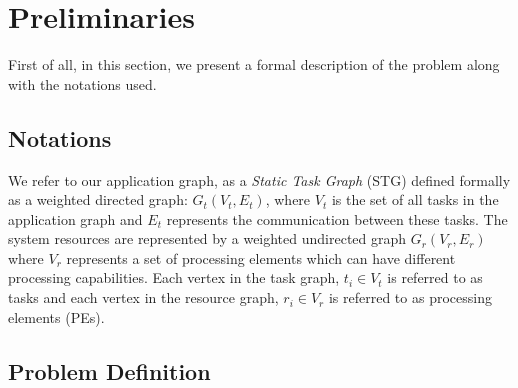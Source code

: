 \documentclass[10pt, conference, compsocconf]{IEEEtran}
\begin{document}
%
\IEEEpeerreviewmaketitle




\section{Preliminaries}
\label{sec:preliminaries}

First of all, in this section, we present a formal description of the
problem along with the notations used.

\subsection{Notations}

We refer to our application graph, as a \textit{Static Task Graph} (STG)
defined formally as a weighted directed graph: $G_t(V_t, E_t)$, where
$V_t$ is the set of all tasks in the application graph and $E_t$
represents the communication between these tasks. The system resources
are represented by a weighted undirected graph $G_r(V_r, E_r)$ where
$V_r$ represents a set of processing elements which can have different
processing capabilities. Each vertex in the task graph, $t_i \in V_t$ is
referred to as tasks and each vertex in the resource graph, $r_i \in
V_r$ is referred to as processing elements (PEs). %

\subsection{Problem Definition}
\end{document}
